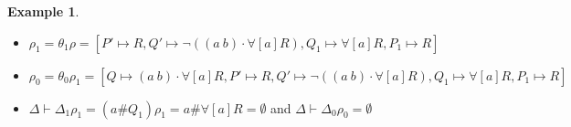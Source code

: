 \documentclass[11pt,a4paper]{amsart}
\newcommand{\alert}[1]{\textcolor{red}{#1}}
\theoremstyle{plain}
\theoremstyle{definition}
\newtheorem{example}{Example}[section]
\theoremstyle{remark}
\begin{document}
\begin{example}
\begin{itemize}
        \item $\rho_1 = \theta_1\rho = [P' \mapsto R, Q'\mapsto \neg((a\ b)\cdot \forall[a]R), Q_1\mapsto \forall[a]R, P_1\mapsto R]$
        \item $\rho_0 = \theta_0\rho_1 = [Q\mapsto(a\ b)\cdot \forall[a]R, P' \mapsto R, Q'\mapsto \neg((a\ b)\cdot \forall[a]R), Q_1\mapsto \forall[a]R, P_1\mapsto R]$
        \item $\Delta\vdash \Delta_1\rho_1 = (a\#Q_1)\rho_1 = a\# \forall[a]R = \emptyset$ and  $\Delta\vdash \Delta_0\rho_0 = \emptyset$
    \end{itemize}
\end{example}

\end{document}
